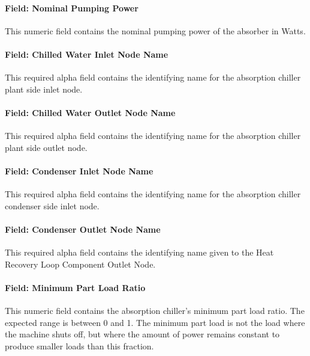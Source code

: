 \paragraph{Field: Nominal Pumping Power}\label{field-nominal-pumping-power}

This numeric field contains the nominal pumping power of the absorber in Watts.

\paragraph{Field: Chilled Water Inlet Node Name}\label{field-chilled-water-inlet-node-name-000}

This required alpha field contains the identifying name for the absorption chiller plant side inlet node.

\paragraph{Field: Chilled Water Outlet Node Name}\label{field-chilled-water-outlet-node-name-000}

This required alpha field contains the identifying name for the absorption chiller plant side outlet node.

\paragraph{Field: Condenser Inlet Node Name}\label{field-condenser-inlet-node-name}

This required alpha field contains the identifying name for the absorption chiller condenser side inlet node.

\paragraph{Field: Condenser Outlet Node Name}\label{field-condenser-outlet-node-name}

This required alpha field contains the identifying name given to the Heat Recovery Loop Component Outlet Node.

\paragraph{Field: Minimum Part Load Ratio}\label{field-minimum-part-load-ratio-001}

This numeric field contains the absorption chiller's minimum part load ratio. The expected range is between 0 and 1. The minimum part load is not the load where the machine shuts off, but where the amount of power remains constant to produce smaller loads than this fraction.

